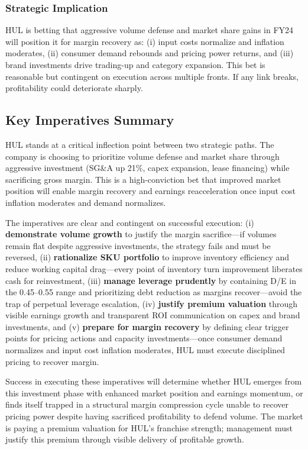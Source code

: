 \documentclass[12pt, a4paper]{report}
\begin{document}
\subsubsection{Strategic Implication}
HUL is betting that aggressive volume defense and market share gains in FY24 will position it for margin recovery as: (i) input costs normalize and inflation moderates, (ii) consumer demand rebounds and pricing power returns, and (iii) brand investments drive trading-up and category expansion. This bet is reasonable but contingent on execution across multiple fronts. If any link breaks, profitability could deteriorate sharply.

\subsection{Key Imperatives Summary}

HUL stands at a critical inflection point between two strategic paths. The company is choosing to prioritize volume defense and market share through aggressive investment (SG\&A up 21\%, capex expansion, lease financing) while sacrificing gross margin. This is a high-conviction bet that improved market position will enable margin recovery and earnings reacceleration once input cost inflation moderates and demand normalizes.

The imperatives are clear and contingent on successful execution: (i) \textbf{demonstrate volume growth} to justify the margin sacrifice—if volumes remain flat despite aggressive investments, the strategy fails and must be reversed, (ii) \textbf{rationalize SKU portfolio} to improve inventory efficiency and reduce working capital drag—every point of inventory turn improvement liberates cash for reinvestment, (iii) \textbf{manage leverage prudently} by containing D/E in the 0.45–0.55 range and prioritizing debt reduction as margins recover—avoid the trap of perpetual leverage escalation, (iv) \textbf{justify premium valuation} through visible earnings growth and transparent ROI communication on capex and brand investments, and (v) \textbf{prepare for margin recovery} by defining clear trigger points for pricing actions and capacity investments—once consumer demand normalizes and input cost inflation moderates, HUL must execute disciplined pricing to recover margin.

Success in executing these imperatives will determine whether HUL emerges from this investment phase with enhanced market position and earnings momentum, or finds itself trapped in a structural margin compression cycle unable to recover pricing power despite having sacrificed profitability to defend volume. The market is paying a premium valuation for HUL's franchise strength; management must justify this premium through visible delivery of profitable growth.
\end{document}
